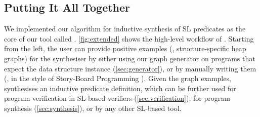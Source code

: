 \subsection{Putting It All Together}

We implemented our algorithm for inductive synthesis of SL predicates
as the core of our tool called \tool. \autoref{fig:extended} shows the
high-level workflow of \tool. Starting from the left, the user can
provide positive examples (\ie, structure-specific heap graphs) for
the synthesiser by either using our graph generator \ggen on programs
that expect the data structure instance (\cf \autoref{sec:generator}),
or by manually writing them (\eg, in the style of Story-Board Programming
\cite{singh2012spt}).
%
Given the graph examples, \tool synthesises an inductive predicate
definition, which can be further used for program verification in SL-based
verifiers (\autoref{sec:verification}), for program synthesis
(\autoref{sec:synthesis}), or by any other SL-based tool.
